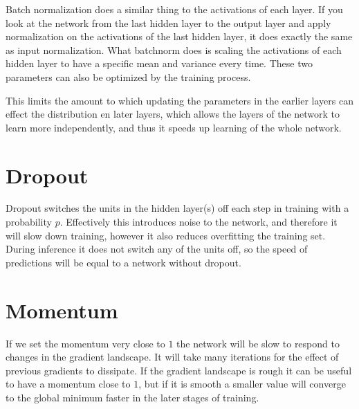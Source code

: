 \documentclass[a4paper]{article}
\begin{document}
Batch normalization does a similar thing to the activations of each layer. If you look at the network from the last hidden layer to the output layer and apply normalization on the activations of the last hidden layer, it does exactly the same as input normalization. What batchnorm does is scaling the activations of each hidden layer to have a specific mean and variance every time. These two parameters can also be optimized by the training process.

This limits the amount to which updating the parameters in the earlier layers can effect the distribution en later layers, which allows the layers of the network to learn more independently, and thus it speeds up learning of the whole network.

\section{Dropout}
Dropout switches the units in the hidden layer(s) off each step in training with a probability $p$. Effectively this introduces noise to the network, and therefore it will slow down training, however it also reduces overfitting the training set. During inference it does not switch any of the units off, so the speed of predictions will be equal to a network without dropout.

\section{Momentum}
If we set the momentum very close to $1$ the network will be slow to respond to changes in the gradient landscape. It will take many iterations for the effect of previous gradients to dissipate. If the gradient landscape is rough it can be useful to have a momentum close to $1$, but if it is smooth a smaller value will converge to the global minimum faster in the later stages of training.

{}

\end{document}
